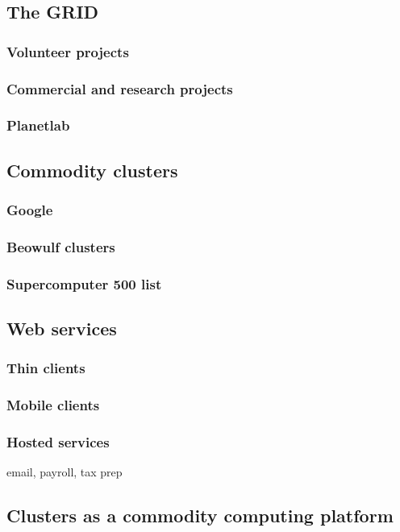 \subsection{The GRID}
\subsubsection{Volunteer projects}
\subsubsection{Commercial and research projects}
\subsubsection{Planetlab}

\subsection{Commodity clusters}
\subsubsection{Google}
\subsubsection{Beowulf clusters}
\subsubsection{Supercomputer 500 list}

\subsection{Web services}
\subsubsection{Thin clients}
\subsubsection{Mobile clients}
\subsubsection{Hosted services}
email, payroll, tax prep

\subsection{Clusters as a commodity computing platform}

